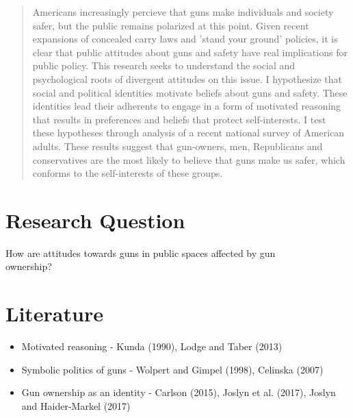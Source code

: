 \documentclass[a0,landscape]{a0poster}
\begin{document}
\begin{multicols}{4} %


\color{Navy} %
\huge
\begin{abstract}
\normalsize
Americans increasingly percieve that guns make individuals and society safer, but the public remains polarized at this point. Given recent expansions of concealed carry laws and 'stand your ground' policies, it is clear that public attitudes about guns and safety have real implications for public policy. This research seeks to understand the social and psychological roots of divergent attitudes on this issue. I hypothesize that social and political identities motivate beliefs about guns and safety. These identities lead their adherents to engage in a form of motivated reasoning that results in preferences and beliefs that protect self-interests. I test these hypotheses through analysis of a recent national survey of American adults. These results suggest that gun-owners, men, Republicans and conservatives are the most likely to believe that guns make us safer, which conforms to the self-interests of these groups.

\end{abstract}


\color{SaddleBrown} %

\huge
\section*{Research Question}

\LARGE How are attitudes towards guns in public spaces affected by gun \\ownership?

\color{DarkSlateGray} %

\section*{Literature}
\Large
\begin{itemize}
	\item[] Motivated reasoning - Kunda (1990), Lodge and Taber (2013)
	\item[] Symbolic politics of guns - Wolpert and Gimpel (1998), Celinska (2007)
	\item[] Gun ownership as an identity - Carlson (2015), Joslyn et al. (2017), Joslyn and Haider-Markel (2017)
\end{itemize}


\end{multicols}
\end{document}

